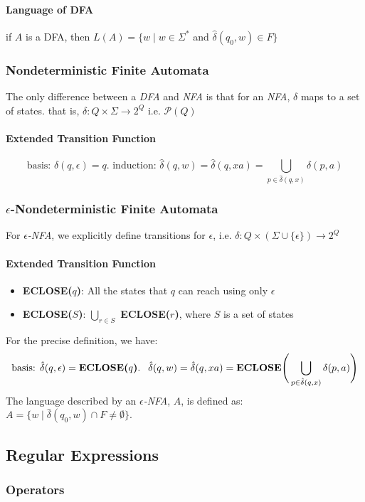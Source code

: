 \documentclass[20pt]{article} %
\begin{document}
\paragraph{Language of DFA} if $A$ is a DFA, then $L(A) = \{ w \mid w \in \Sigma^{*}$ and $\hat{\delta}(q_0, w) \in F \}$
\subsubsection{Nondeterministic Finite Automata}
The only difference between a \textit{DFA} and \textit{NFA} is that for an \textit{NFA}, $\delta$ maps to a set of states. that is, $\delta: Q \times \Sigma \rightarrow 2^{Q}$ i.e. $\mathcal{P}(Q)$
\paragraph{Extended Transition Function}
$$\text{basis: } \hat{\delta}(q, \epsilon) = q. \text{  induction: } \hat{\delta}(q,w) = \hat{\delta}(q, xa) = \bigcup_{p \in \hat{\delta}(q,x)}\delta(p,a)$$
\subsubsection{$\epsilon$-Nondeterministic Finite Automata}
For $\epsilon$\textit{-NFA}, we explicitly define transitions for $\epsilon$, i.e. $\delta: Q \times (\Sigma \cup \{ \epsilon \}) \rightarrow 2^{Q}$
\paragraph{Extended Transition Function}
\begin{itemize}
\item \textbf{ECLOSE($q$)}: All the states that $q$ can reach using only $\epsilon$
\item \textbf{ECLOSE($S$)}: $\bigcup_{r \in S}$ \textbf{ECLOSE($r$)}, where $S$ is a set of states
\end{itemize}
For the precise definition, we have: 
$$\text{basis: } \hat{\delta}(q, \epsilon) = \text{\textbf{ECLOSE($q$)}. } \ \hat{\delta}(q,w) = \hat{\delta}(q, xa) = \text{\textbf{ECLOSE}} \Bigg( \bigcup_{p \in \hat{\delta}(q,x)}\delta(p,a) \Bigg)$$
The language described by an $\epsilon$\textit{-NFA}, $A$, is defined as: $A = \{ w \mid \hat{\delta}(q_0, w) \cap F \neq \emptyset \}$.
\subsection{Regular Expressions}
\subsubsection{Operators}
\end{document}
